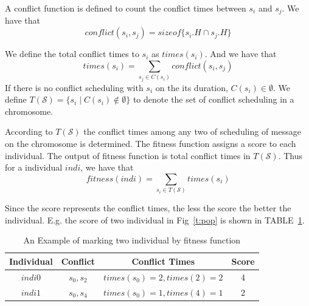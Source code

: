 \documentclass[journal]{IEEEtran}
\newcommand{\calS}{\mathcal{S}}
\theoremstyle{remark}
\begin{document}
A conflict function is defined to count the conflict times between $s_i$ and $s_j$.
We have that
\begin{equation}
	conflict(s_i,s_j) = sizeof \{s_i.H \cap s_j.H\}
\end{equation}

We define the total conflict times to $s_{i}$ as $times(s_i)$. And we have that
\begin{equation}
	times(s_i)=\sum_{ s_j \in C(s_i) } conflict(s_i,s_j)
\end{equation}
If there is no conflict scheduling with $s_i$ on the its duration,
 $C(s_i)\in \emptyset$.
We define $T(\calS) = \{ s_i \mid C(s_i) \notin \emptyset \} $ to denote the set of conflict scheduling in a chromosome.

According to $T(\calS)$ the conflict times among any two of scheduling of message on the chromosome is determined.
The fitness function assigns a score to each individual.
The output of fitness function is total conflict times in $T(\calS)$.
Thus for a individual $indi$, we have that
\begin{equation}
	fitness(indi)=\sum_{s_i \in T(\calS)} {times(s_i)}
\end{equation}

Since the score represents the conflict times, the less the score the better the individual.
E.g. the score of two individual in Fig~\ref{t:pop} is shown in TABLE~\ref{t:fitness}. 

\begin{table}[!t]
	\renewcommand{\arraystretch}{1.3}
	\caption{An Example of marking two individual by fitness function}
	\label{t:fitness}
	\centering
	\begin{tabular}{|c||c||c||c|}
		\hline
		\textbf{Individual} & \textbf{Conflict} &\textbf{Conflict Times} &\textbf{Score}\\
		\hline 
		$indi0$ &$s_0,s_2$ & $times(s_0)=2,times(2)=2$ &4\\
		\hline
		$indi1$ & $s_0,s_4$& $times(s_0)=1,times(4)=1$ &2\\
		\hline
		\end{tabular}	
\end{table}
\end{document}

